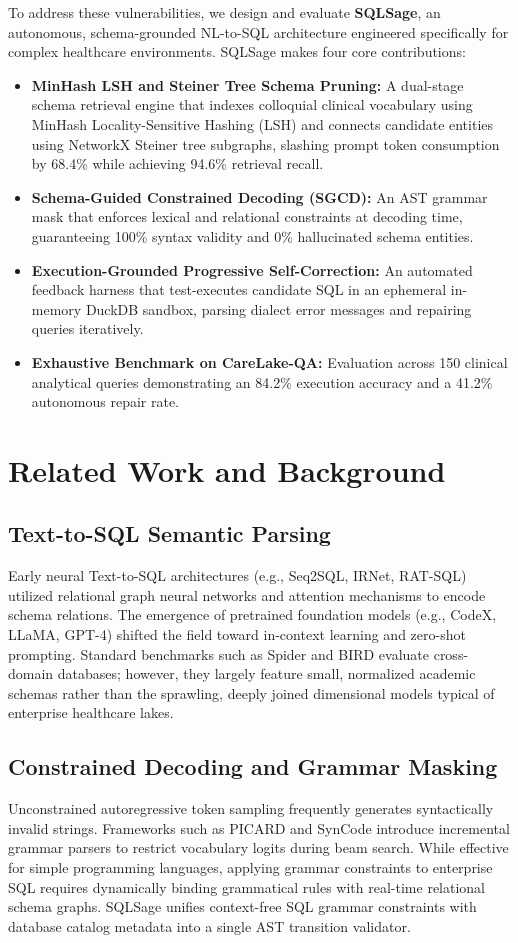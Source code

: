 \documentclass[10pt,journal,compsoc]{IEEEtran}
\begin{document}
To address these vulnerabilities, we design and evaluate \textbf{SQLSage}, an autonomous, schema-grounded NL-to-SQL architecture engineered specifically for complex healthcare environments. SQLSage makes four core contributions:
\begin{itemize}
    \item \textbf{MinHash LSH and Steiner Tree Schema Pruning:} A dual-stage schema retrieval engine that indexes colloquial clinical vocabulary using MinHash Locality-Sensitive Hashing (LSH) and connects candidate entities using NetworkX Steiner tree subgraphs, slashing prompt token consumption by 68.4\% while achieving 94.6\% retrieval recall.
    \item \textbf{Schema-Guided Constrained Decoding (SGCD):} An AST grammar mask that enforces lexical and relational constraints at decoding time, guaranteeing 100\% syntax validity and 0\% hallucinated schema entities.
    \item \textbf{Execution-Grounded Progressive Self-Correction:} An automated feedback harness that test-executes candidate SQL in an ephemeral in-memory DuckDB sandbox, parsing dialect error messages and repairing queries iteratively.
    \item \textbf{Exhaustive Benchmark on CareLake-QA:} Evaluation across 150 clinical analytical queries demonstrating an 84.2\% execution accuracy and a 41.2\% autonomous repair rate.
\end{itemize}

\section{Related Work and Background}
\subsection{Text-to-SQL Semantic Parsing}
Early neural Text-to-SQL architectures (e.g., Seq2SQL, IRNet, RAT-SQL) utilized relational graph neural networks and attention mechanisms to encode schema relations. The emergence of pretrained foundation models (e.g., CodeX, LLaMA, GPT-4) shifted the field toward in-context learning and zero-shot prompting. Standard benchmarks such as Spider and BIRD evaluate cross-domain databases; however, they largely feature small, normalized academic schemas rather than the sprawling, deeply joined dimensional models typical of enterprise healthcare lakes.

\subsection{Constrained Decoding and Grammar Masking}
Unconstrained autoregressive token sampling frequently generates syntactically invalid strings. Frameworks such as PICARD and SynCode introduce incremental grammar parsers to restrict vocabulary logits during beam search. While effective for simple programming languages, applying grammar constraints to enterprise SQL requires dynamically binding grammatical rules with real-time relational schema graphs. SQLSage unifies context-free SQL grammar constraints with database catalog metadata into a single AST transition validator.
\end{document}
